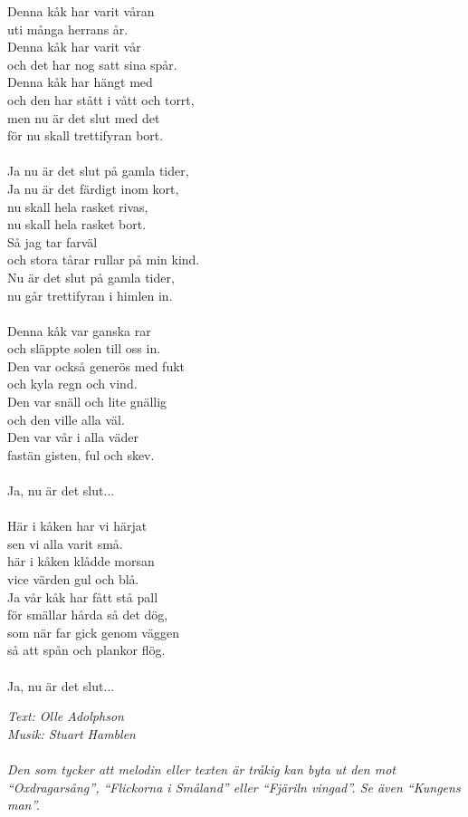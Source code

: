 \vspace{10pt}
Denna kåk har varit våran\\
uti många herrans år.\\
Denna kåk har varit vår\\
och det har nog satt sina spår.\\
Denna kåk har hängt med\\
och den har stått i vått och torrt,\\
men nu är det slut med det\\
för nu skall trettifyran bort.\\
\\
Ja nu är det slut på gamla tider,\\
Ja nu är det färdigt inom kort,\\
nu skall hela rasket rivas,\\
nu skall hela rasket bort.\\
Så jag tar farväl\\
och stora tårar rullar på min kind.\\
Nu är det slut på gamla tider,\\
nu går trettifyran i himlen in.\\
\\
Denna kåk var ganska rar\\
och släppte solen till oss in.\\
Den var också generös med fukt\\
och kyla  regn och vind.\\
Den var snäll och lite gnällig\\
och den ville alla väl.\\
Den var vår i alla väder\\
fastän gisten, ful och skev.\\
\\
Ja, nu är det slut...\\
\\
Här i kåken har vi härjat\\
sen vi alla varit små.\\
här i kåken klådde morsan\\
vice värden gul och blå.\\
Ja vår kåk har fått stå pall\\
för smällar hårda så det dög,\\
som när far gick genom väggen\\
så att spån och plankor flög.\\
\\
Ja, nu är det slut...\par
\vspace{10pt}
{\footnotesize\textit{Text: Olle Adolphson\\
Musik: Stuart Hamblen\\
\\
Den som tycker att melodin eller texten är tråkig kan byta ut den mot ``Oxdragarsång'', ``Flickorna i Småland'' eller ``Fjäriln vingad''. Se även ``Kungens man''.}}

